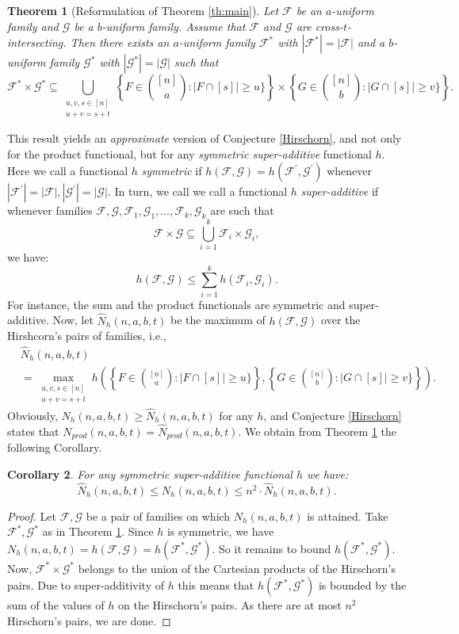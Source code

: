 \documentclass[12pt]{article}
\let\leq\leqslant
\let\geq\geqslant
\let\le\leq
\let\ge\geq
\def\F{{\mathcal F}}
\def\G{{\mathcal G}}
\newtheorem{theorem}{Theorem}
\newtheorem{corollary}[theorem]{Corollary}
\begin{document}
\begin{theorem}[Reformulation of Theorem \ref{th:main}]
\label{th:ref}
Let $\F$ be an $a$-uniform family and $\G$ be a $b$-uniform family. Assume that $\F$ and $\G$ are cross-$t$-intersecting. Then there exists an $a$-uniform family $\F^*$ with $|\F^*| = |\F|$ and a $b$-uniform family $\G^*$ with $|\G^*| = |\G|$ such that
$$\F^* \times \G^* \subseteq \bigcup\limits_{\substack{u,v,s\in [n] \\ u + v = s + t}} \left\{F \in\binom{[n]}{a} : |F\cap [s]| \ge u\}\right\} \times \left\{G \in\binom{[n]}{b} : |G\cap [s]| \ge v\}\right\}.$$
\end{theorem}
This result yields an \emph{approximate} version of Conjecture \ref{Hirschorn}, and not only for the product functional, but for any \emph{symmetric super-additive} functional $h$. Here we call a functional $h$ \emph{symmetric} if $h(\F, \G) = h(\F^\prime, \G^\prime)$ whenever $|\F^\prime| = |\F|, |\G^\prime| = |\G|$. In turn, we call 
we call a functional $h$ \emph{super-additive} if whenever families $\F, \G, \F_1, \G_1, \ldots, \F_k,\G_k$ are such that
$$\F\times \G \subseteq \bigcup\limits_{i = 1}^k \F_i\times \G_i,$$
we have:
$$h(\F, \G) \le \sum\limits_{i = 1}^k h(\F_i, \G_i).$$
For instance, the sum and the product functionals are symmetric and super-additive. Now, let $\widehat{N}_h(n, a, b, t)$ be the maximum of $h(\F,\G)$ over the Hirshcorn's pairs of families, i.e.,
\begin{align*}
&\widehat{N}_h(n, a, b, t) \\ &= \max\limits_{\substack{u,v,s\in [n] \\ u + v = s + t}}h\left( \left\{F \in\binom{[n]}{a} : |F\cap [s]| \ge u\}\right\}, \left\{G \in\binom{[n]}{b} : |G\cap [s]| \ge v\}\right\}\right).
\end{align*}
Obviously, $N_h(n, a, b, t) \ge \widehat{N}_h(n, a, b, t)$ for any $h$, and Conjecture \ref{Hirschorn} states that $N_{prod}(n, a, b, t) = \widehat{N}_{prod}(n, a, b, t)$. We obtain from Theorem \ref{th:ref} the following Corollary.
\begin{corollary} 
\label{sa}
For any symmetric super-additive functional $h$ we have:
$$\widehat{N}_h(n,a,b,t) \le N_h(n,a,b,t) \le n^2 \cdot \widehat{N}_h(n,a,b,t).$$
\end{corollary}
\begin{proof}
Let $\F, \G$ be a pair of families on which $N_h(n,a,b,t)$ is attained. Take $\F^*, \G^*$ as in Theorem \ref{th:ref}. Since $h$ is symmetric, we have $N_h(n, a, b, t) = h(\F,\G) = h(\F^*,\G^*)$. So it remains to bound $h(\F^*,\G^*)$. Now, $\F^*\times \G^*$ belongs to the union of the Cartesian products of the Hirschorn's pairs.  Due to super-additivity of $h$ this means that $h(\F^*,\G^*)$ is bounded by the sum of the values of $h$ on the Hirschorn's pairs. As there are at most $n^2$ Hirschorn's pairs, we are done.
\end{proof}
\end{document}

